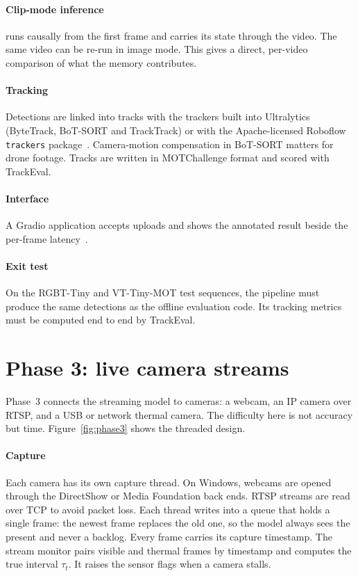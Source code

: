 \paragraph{Clip-mode inference}
\methodS{} runs causally from the first frame and carries its state through
the video. The same video can be re-run in image mode. This gives a direct,
per-video comparison of what the memory contributes.

\paragraph{Tracking}
Detections are linked into tracks with the trackers built into Ultralytics
(ByteTrack, BoT-SORT and TrackTrack) or with the Apache-licensed Roboflow
\texttt{trackers} package~\citep{roboflowtrackers_repo}. Camera-motion
compensation in BoT-SORT matters for drone footage. Tracks are written in
MOTChallenge format and scored with TrackEval.

\paragraph{Interface}
A Gradio application accepts uploads and shows the annotated result beside
the per-frame latency~\citep{gradio_repo}.

\paragraph{Exit test}
On the RGBT-Tiny and VT-Tiny-MOT test sequences, the pipeline must produce
the same detections as the offline evaluation code. Its tracking metrics
must be computed end to end by TrackEval.



\section{Phase 3: live camera streams}
\label{sec:phase3}

Phase~3 connects the streaming model to cameras: a webcam, an IP camera over
RTSP, and a USB or network thermal camera. The difficulty here is not
accuracy but time. Figure~\ref{fig:phase3} shows the threaded design.

\paragraph{Capture}
Each camera has its own capture thread. On Windows, webcams are opened
through the DirectShow or Media Foundation back ends. RTSP streams are read
over TCP to avoid packet loss. Each thread writes into a queue that holds a
single frame: the newest frame replaces the old one, so the model always
sees the present and never a backlog. Every frame carries its capture
timestamp. The stream monitor pairs visible and thermal frames by timestamp
and computes the true interval $\tau_t$. It raises the sensor flags when a
camera stalls.

